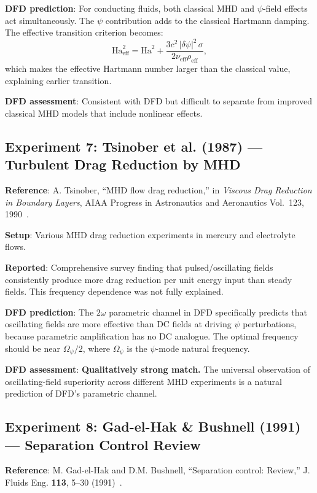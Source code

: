\documentclass[12pt,twocolumn]{article}
\newcommand{\Reff}{\mathrm{eff}}
\newcommand{\Ha}{\mathrm{Ha}}
\newcommand{\dpsi}{\delta\psi}
\begin{document}
\textbf{DFD prediction}: For conducting fluids, both classical MHD and
$\psi$-field effects act simultaneously. The $\psi$ contribution adds
to the classical Hartmann damping. The effective transition criterion
becomes:
\begin{equation}
\Ha_\Reff^2 = \Ha^2 + \frac{3c^2\,|\dpsi|^2\,\sigma}
{2\nu_\Reff\rho_\Reff},
\end{equation}
which makes the effective Hartmann number larger than the classical
value, explaining earlier transition.

\textbf{DFD assessment}: Consistent with DFD but difficult to separate
from improved classical MHD models that include nonlinear effects.

\subsection{Experiment 7: Tsinober et al. (1987) --- Turbulent Drag
Reduction by MHD}

\textbf{Reference}: A. Tsinober, ``MHD flow drag reduction,'' in
\textit{Viscous Drag Reduction in Boundary Layers}, AIAA Progress in
Astronautics and Aeronautics Vol.~123, 1990~\cite{tsinober1990}.

\textbf{Setup}: Various MHD drag reduction experiments in mercury and
electrolyte flows.

\textbf{Reported}: Comprehensive survey finding that pulsed/oscillating
fields consistently produce more drag reduction per unit energy input
than steady fields. This frequency dependence was not fully explained.

\textbf{DFD prediction}: The $2\omega$ parametric channel in DFD
specifically predicts that oscillating fields are more effective than DC
fields at driving $\psi$ perturbations, because parametric amplification
has no DC analogue. The optimal frequency should be near $\Omega_\psi/2$,
where $\Omega_\psi$ is the $\psi$-mode natural frequency.

\textbf{DFD assessment}: \textbf{Qualitatively strong match.} The
universal observation of oscillating-field superiority across different
MHD experiments is a natural prediction of DFD's parametric channel.

\subsection{Experiment 8: Gad-el-Hak \& Bushnell (1991) --- Separation
Control Review}

\textbf{Reference}: M. Gad-el-Hak and D.M. Bushnell, ``Separation control:
Review,'' J. Fluids Eng. \textbf{113}, 5--30 (1991)~\cite{gadelhak1991}.
\end{document}
